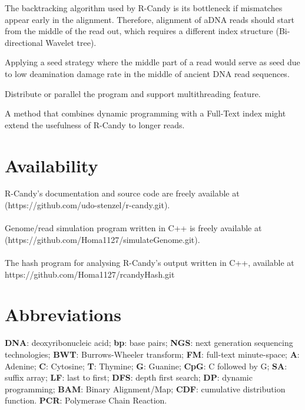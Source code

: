 \documentclass[11pt,a4paper]{report}
\begin{document}
The backtracking algorithm used by R-Candy is its bottleneck if mismatches 
appear early in the alignment. 
Therefore, alignment of aDNA reads should start from the middle of the read 
out, which requires a different index structure (Bi-directional Wavelet tree).

Applying a seed strategy where the middle part of a read would serve as seed
due to low deamination damage rate in the middle of  ancient DNA read sequences.

Distribute or parallel the program and support multithreading feature.

A method that combines dynamic programming with a Full-Text index might extend
the usefulness of R-Candy to longer reads.


\section{Availability} \label{Availability}

R-Candy's documentation and source code are freely available at\\
 (https://github.com/udo-stenzel/r-candy.git).
\\\\
Genome/read simulation program written in C++ is freely available at
(https://github.com/Homa1127/simulateGenome.git).
\\\\
The hash program for analysing R-Candy's output written in C++, available at
https://github.com/Homa1127/rcandyHash.git




\section{Abbreviations} \label{Abbreviations}

\textbf{DNA}: deoxyribonucleic acid;
\textbf{bp}: base pairs;
\textbf{NGS}: next generation sequencing technologies;
\textbf{BWT}: Burrows-Wheeler transform;
\textbf{FM}: full-text minute-space;
\textbf{A}: Adenine;
\textbf{C}: Cytosine;
\textbf{T}: Thymine;
\textbf{G}: Guanine;
\textbf{CpG}: C followed by G;
\textbf{SA}: suffix array;
\textbf{LF}: last to first;
\textbf{DFS}: depth first search;
\textbf{DP}: dynamic programming;
\textbf{BAM}: Binary Alignment/Map;
\textbf{CDF}: cumulative distribution function.
\textbf{PCR}: Polymerase Chain Reaction.
\end{document}
